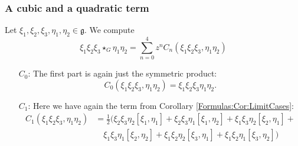 \subsubsection*{A cubic and a quadratic term}
Let $\xi_1, \xi_2, \xi_3, \eta_1, \eta_2 \in \mathfrak{g}$. We compute
\begin{equation*}
	\xi_1 \xi_2 \xi_3 \star_G \eta_1 \eta_2
	= 
	\sum\limits_{n = 0}^4
	z^n C_n(\xi_1 \xi_2 \xi_3, \eta_1 \eta_2)
\end{equation*}
\begin{itemize}
	\item[$C_0$:]
	The first part is again just the symmetric product:
	\begin{equation*}
		C_0(\xi_1 \xi_2 \xi_3, \eta_1 \eta_2)
		=
		\xi_1 \xi_2 \xi_3 \eta_1 \eta_2.
	\end{equation*}
	
	\item[$C_1$:]
	Here we have again the term from Corollary \ref{Formulas:Cor:LimitCases}:
	\begin{align*}
		C_1(\xi_1 \xi_2 \xi_3, \eta_1 \eta_2)
		& =
		\frac{1}{2} 
		\big( 
			\xi_2 \xi_3 \eta_2 [\xi_1, \eta_1] + 
			\xi_2 \xi_3 \eta_1 [\xi_1, \eta_2] + 
			\xi_1 \xi_3 \eta_2 [\xi_2, \eta_1] +
		\\
		& \quad 
			\xi_1 \xi_3 \eta_1 [\xi_2, \eta_2] + 
			\xi_1 \xi_2 \eta_2 [\xi_3, \eta_1] + 
			\xi_1 \xi_2 \eta_1 [\xi_3, \eta_2] 
 		\big)
	\end{align*}


\end{itemize}
